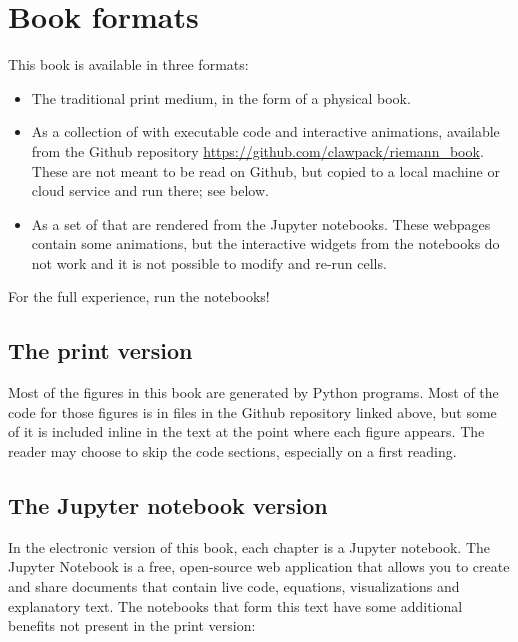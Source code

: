 \documentclass{SIAMbook2016}
\begin{document}
\hypertarget{book-formats}{%
\section{Book formats}\label{book-formats}}

This book is available in three formats:

\begin{itemize}
\item
  The traditional print medium, in the form of a physical book.
\item
  As a collection of  with
  executable code and interactive animations, available from the Github
  repository \url{https://github.com/clawpack/riemann_book}. These are
  not meant to be read on Github, but copied to a local machine or cloud
  service and run there; see below.
\item
  As a set of
  that are rendered from the Jupyter notebooks. These webpages contain
  some animations, but the interactive widgets from the notebooks do not
  work and it is not possible to modify and re-run cells.
\end{itemize}

For the full experience, run the notebooks!

\hypertarget{the-print-version}{%
\subsection{The print version}\label{the-print-version}}

Most of the figures in this book are generated by Python programs. Most
of the code for those figures is in files in the Github repository
linked above, but some of it is included inline in the text at the point
where each figure appears. The reader may choose to skip the code
sections, especially on a first reading.

\hypertarget{the-jupyter-notebook-version}{%
\subsection{The Jupyter notebook
version}\label{the-jupyter-notebook-version}}

In the electronic version of this book, each chapter is a Jupyter
notebook. The Jupyter Notebook is a free, open-source web application
that allows you to create and share documents that contain live code,
equations, visualizations and explanatory text. The notebooks that form
this text have some additional benefits not present in the print
version:
\end{document}
